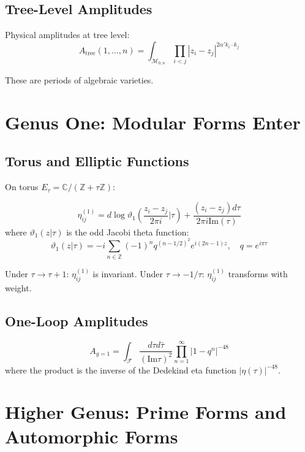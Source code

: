 \subsection{Tree-Level Amplitudes}

Physical amplitudes at tree level:
$$A_{\text{tree}}(1, \ldots, n) = \int_{\mathcal{M}_{0,n}} \prod_{i<j} |z_i - z_j|^{2\alpha'k_i \cdot k_j}$$

These are periods of algebraic varieties.

\section{Genus One: Modular Forms Enter}

\subsection{Torus and Elliptic Functions}

On torus $E_\tau = \mathbb{C}/(\mathbb{Z} + \tau\mathbb{Z})$:

\begin{definition}
$$\eta_{ij}^{(1)} = d\log\vartheta_1\left(\frac{z_i - z_j}{2\pi i}\Big|\tau\right) + \frac{(z_i - z_j)d\tau}{2\pi i \text{Im}(\tau)}$$
where $\vartheta_1(z|\tau)$ is the odd Jacobi theta function:
$$\vartheta_1(z|\tau) = -i\sum_{n \in \mathbb{Z}} (-1)^n q^{(n-1/2)^2} e^{i(2n-1)z}, \quad q = e^{i\pi\tau}$$
\end{definition}

\begin{theorem}
Under $\tau \to \tau + 1$: $\eta_{ij}^{(1)}$ is invariant.
Under $\tau \to -1/\tau$: $\eta_{ij}^{(1)}$ transforms with weight.
\end{theorem}

\subsection{One-Loop Amplitudes}

\begin{example}
$$A_{g=1} = \int_{\mathcal{F}} \frac{d\tau d\bar{\tau}}{(\text{Im}\tau)^2} \prod_{n=1}^{\infty} |1 - q^n|^{-48}$$
where the product is the inverse of the Dedekind eta function $|\eta(\tau)|^{-48}$.
\end{example}

\section{Higher Genus: Prime Forms and Automorphic Forms}

